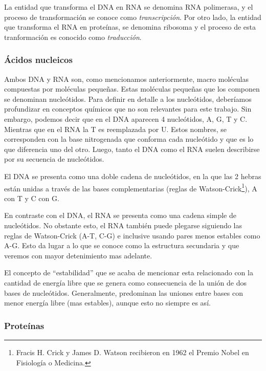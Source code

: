 La entidad que transforma el \ac{DNA} en \ac{RNA} se denomina \ac{RNA}
polimerasa, y el proceso de transformaci\'on se conoce como
\textit{transcripci\'on}. Por otro lado, la entidad que transforma el
\ac{RNA} en prote\'inas, se denomina ribosoma y el proceso de esta
tranformaci\'on es conocido como \textit{traducci\'on}.

\subsubsection{\'Acidos nucleicos}

Ambos \ac{DNA} y \ac{RNA} son, como mencionamos anteriormente, macro mol\'eculas
compuestas por mol\'eculas peque\~nas. Estas mol\'eculas peque\~nas que los
componen se denominan nucle\'otidos. Para definir en detalle a los
nucle\'otidos, deber\'iamos profundizar en conceptos qu\'imicos que no son
relevantes para este trabajo. Sin embargo, podemos decir que en el \ac{DNA}
aparecen 4 nucle\'otidos, \ac{A}, \ac{G}, \ac{T} y \ac{C}. Mientras que en el
\ac{RNA} la \ac{T} es reemplazada por \ac{U}. Estos nombres, se corresponden
con la base nitrogenada que conforma cada nucle\'otido y que es lo que
diferencia uno del otro. Luego, tanto el \ac{DNA} como el \ac{RNA} suelen
describirse por su secuencia de nucle\'otidos.

El \ac{DNA} se presenta como una doble cadena de nucle\'otidos, en la que las 2
hebras est\'an unidas a trav\'es de las bases complementarias (reglas de
Watson-Crick\footnote{Fracis H. Crick y James D. Watson recibieron en 1962 el
Premio Nobel en Fisiolog\'ia o Medicina.}), \ac{A} con
\ac{T} y \ac{C} con \ac{G}.

En contraste con el \ac{DNA}, el \ac{RNA} se presenta como una cadena simple de
nucle\'otidos. No obstante esto, el \ac{RNA} tambi\'en puede plegarse siguiendo
las reglas de Watson-Crick (\ac{A}-\ac{T}, \ac{C}-\ac{G}) e inclusive usando
pares menos estables como \ac{A}-\ac{G}. Esto da lugar a lo que se conoce
como la estructura secundaria y que veremos con mayor detenimiento mas adelante.

El concepto de ``estabilidad'' que se acaba de mencionar esta relacionado con
la cantidad de energ\'ia libre que se genera como consecuencia de la uni\'on de
dos bases de nucle\'otidos. Generalmente, predominan las uniones entre bases con
menor energ\'ia libre (mas estables), aunque esto no siempre es as\'i.

\subsubsection{Prote\'inas}

